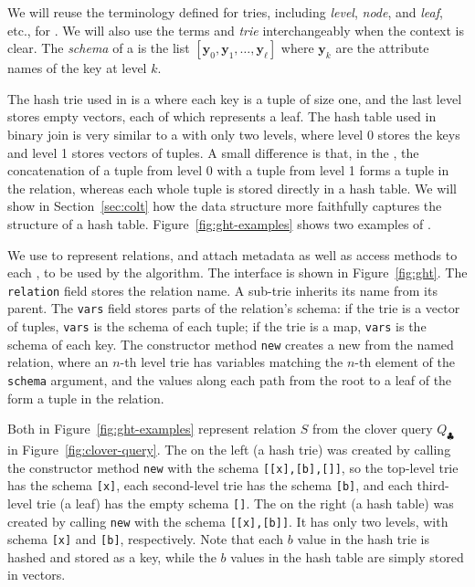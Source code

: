 We will reuse the terminology defined for tries, including
\emph{level}, \emph{node}, and \emph{leaf}, etc., for \GHTs.  We will
also use the terms \GHT and \emph{trie} interchangeably when the
context is clear.  The {\em schema} of a \GHT is the list
$[\bm y_0,\bm y_1, \ldots, \bm y_\ell]$ where $\bm y_k$ are the
attribute names of the key at level $k$.

The hash trie used in \GJ is a \GHT where each key is a tuple of size one,
and the last level stores empty vectors, each of which represents a leaf.
The hash table used in binary join is very similar to a \GHT with only two levels,
where level 0 stores the keys and level 1 stores
vectors of tuples.
A small difference is that, in the \GHT, the concatenation of
a tuple from level 0 with a tuple from level 1 forms a tuple in the relation,
whereas each whole tuple is stored directly in a hash table.
We will show in Section~\ref{sec:colt} how the \COLT data structure
more faithfully captures the structure of a hash table.
Figure~\ref{fig:ght-examples} shows two examples of \GHTs.

We use \GHTs to represent relations,
and attach metadata as well as access methods
to each \GHT, to be used by the \FJ algorithm.
The \GHT interface is shown in Figure~\ref{fig:ght}.
The \lstinline|relation| field stores the relation name.
A sub-trie inherits its name from its parent.
The \lstinline|vars| field stores parts of the relation's schema:
if the trie is a vector of tuples,
\lstinline|vars| is the schema of each tuple;
if the trie is a map,
\lstinline|vars| is the schema of each key.
The constructor method \lstinline|new| creates a new \GHT from the named relation,
where an $n$-th level trie has variables
matching the $n$-th element of the \lstinline|schema| argument,
and the values along each path from the root to a leaf of the \GHT
form a tuple in the relation.

\begin{example}
  Both \GHTs in Figure~\ref{fig:ght-examples} represent relation $S$ from the
  clover query $Q_\clubsuit$ in Figure~\ref{fig:clover-query}.  The
  \GHT on the left (a hash trie) was created by calling the
  constructor method \lstinline|new| with the schema
  \lstinline|[[x],[b],[]]|, so the top-level trie has the schema
  \lstinline|[x]|, each second-level trie has the schema
  \lstinline|[b]|, and each third-level trie (a leaf) has the empty
  schema \lstinline|[]|.  The \GHT on the right (a hash table) was
  created by calling \lstinline|new| with the schema
  \lstinline|[[x],[b]]|.  It has only two levels, with schema
  \lstinline|[x]| and \lstinline|[b]|, respectively.  Note that each
  $b$ value in the hash trie is hashed and stored as a key, while the
  $b$ values in the hash table are simply stored in vectors.
\end{example}

